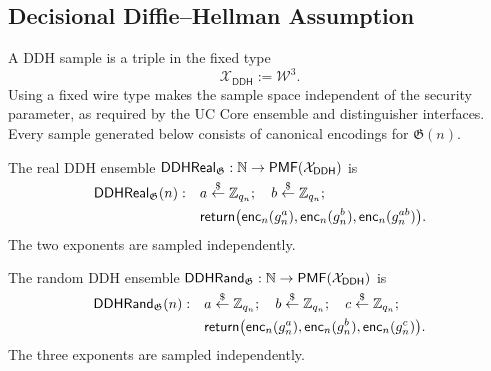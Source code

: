 \subsection{Decisional Diffie--Hellman Assumption}

\begin{definition}
\label{def:dhke-ddh-sample}
\notready
A DDH sample is a triple in the fixed type
\[
  \mathcal X_{\mathsf{DDH}}:=\mathcal W^3.
\]
Using a fixed wire type makes the sample space independent of the security
parameter, as required by the UC Core ensemble and distinguisher interfaces.
Every sample generated below consists of canonical encodings for
\(\mathfrak G(n)\).
\end{definition}

\begin{definition}
\label{def:dhke-ddh-real}
\notready
The real DDH ensemble
\(\mathsf{DDHReal}_{\mathfrak G}:\mathbb{N}\to
\mathsf{PMF}(\mathcal X_{\mathsf{DDH}})\) is
\[
\begin{aligned}
  \mathsf{DDHReal}_{\mathfrak G}(n):
  \quad&a\stackrel{\smash{\$}}\gets\mathbb Z_{q_n};\quad
        b\stackrel{\smash{\$}}\gets\mathbb Z_{q_n};\\
  &\mathsf{return}\bigl(
      \mathsf{enc}_n(g_n^a),
      \mathsf{enc}_n(g_n^b),
      \mathsf{enc}_n(g_n^{ab})
    \bigr).
\end{aligned}
\]
The two exponents are sampled independently.
\end{definition}

\begin{definition}
\label{def:dhke-ddh-random}
\notready
The random DDH ensemble
\(\mathsf{DDHRand}_{\mathfrak G}:\mathbb{N}\to
\mathsf{PMF}(\mathcal X_{\mathsf{DDH}})\) is
\[
\begin{aligned}
  \mathsf{DDHRand}_{\mathfrak G}(n):
  \quad&a\stackrel{\smash{\$}}\gets\mathbb Z_{q_n};\quad
        b\stackrel{\smash{\$}}\gets\mathbb Z_{q_n};\quad
        c\stackrel{\smash{\$}}\gets\mathbb Z_{q_n};\\
  &\mathsf{return}\bigl(
      \mathsf{enc}_n(g_n^a),
      \mathsf{enc}_n(g_n^b),
      \mathsf{enc}_n(g_n^c)
    \bigr).
\end{aligned}
\]
The three exponents are sampled independently.
\end{definition}

